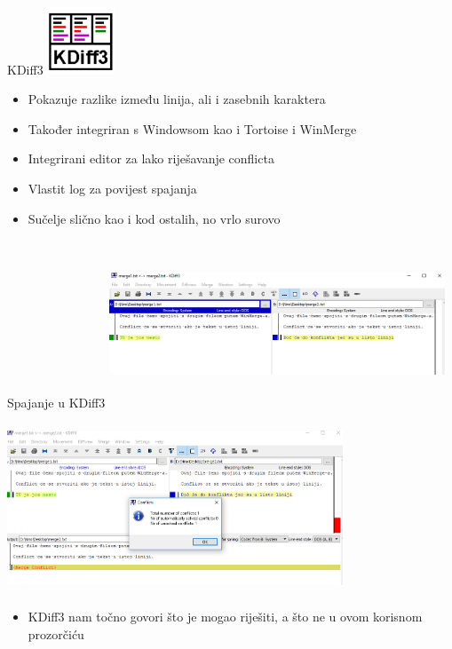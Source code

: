 \begin{frame}{KDiff3}
    \includegraphics[width=2cm, height=2cm]{kdiff1.png}
    \begin{itemize}
        \item Pokazuje razlike između linija, ali i zasebnih karaktera
        \item Također integriran s Windowsom kao i Tortoise i WinMerge
        \item Integrirani editor za lako riješavanje conflicta
        \item Vlastit log za povijest spajanja
        \item Sučelje slično kao i kod ostalih, no vrlo surovo
    \end{itemize}
\end{frame}
\begin{frame}{Spajanje u KDiff3}
    \includegraphics[width=10cm, height=5cm]{kdiff2.png}
    
\end{frame}
    \begin{frame}
    \includegraphics[width=10cm, height=5cm]{kdiff3.png}
    \begin{itemize}
        \item KDiff3 nam točno govori što je mogao riješiti, a što ne u ovom korisnom prozorčiću
    \end{itemize}
    
\end{frame}
